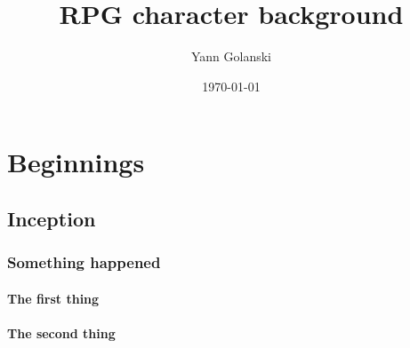 \usepackage{lipsum}

\usepackage{hyperref}
\usepackage{longtable}

\usepackage{tabu}

\usepackage{booktabs}

\usepackage{graphicx}

\title{RPG character background}
\date{\today}
\author{Yann Golanski}


\frontmatter
\maketitle
\tableofcontents

\mainmatter

\part{Beginnings}

\chapter{Inception}



\lipsum[1]

\lipsum[2]

\section{Something happened}

\subsection{The first thing}

\lipsum[3]

\lipsum[4]

\subsection{The second thing}

